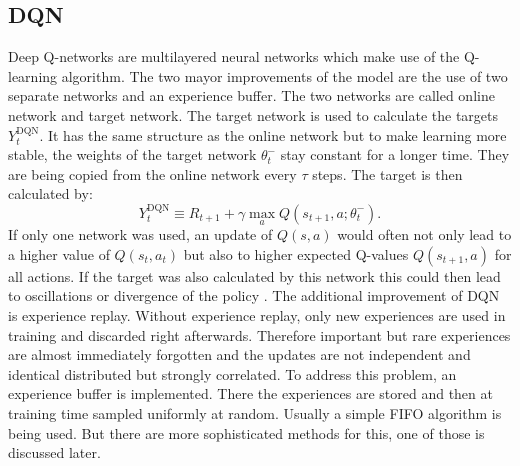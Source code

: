 \subsection{DQN}
Deep Q-networks \cite{DBLP:journals/corr/MnihKSGAWR13} are multilayered neural networks which make use of the Q-learning algorithm. The two mayor improvements of the model are the use of two separate networks and an experience buffer.
The two networks are called online network and target network. The target network is used to calculate the targets $Y_{t}^{\mathrm{DQN}}$. It has the same structure as the online network but to make learning more stable, the weights of the target network $\theta_t^-$ stay constant for a longer time. 
They are being copied from the online network every $\tau$ steps.
The target is then calculated by:
\begin{equation}
Y_{t}^{\mathrm{DQN}} \equiv R_{t+1}+\gamma \max _{a} Q\left(s_{t+1}, a ; \theta_{t}^{-}\right).
\end{equation}
If only one network was used, an update of $Q(s,a)$ would often not only lead to a higher value of $Q(s_t,a_t)$ but also to higher expected Q-values $Q(s_{t+1},a)$ for all actions. If the target was also calculated by this network this could then lead to oscillations or divergence of the policy \cite{DBLP:journals/corr/MnihKSGAWR13}.
The additional improvement of DQN is experience replay. Without experience replay, only new experiences are used in training and discarded right afterwards.
Therefore important but rare experiences are almost immediately forgotten and the updates are not independent and identical distributed but strongly correlated. %
To address this problem, an experience buffer is implemented. There the experiences are stored and then at training time sampled uniformly at random. Usually a simple FIFO algorithm is being used. But there are more sophisticated methods for this, one of those is discussed later.